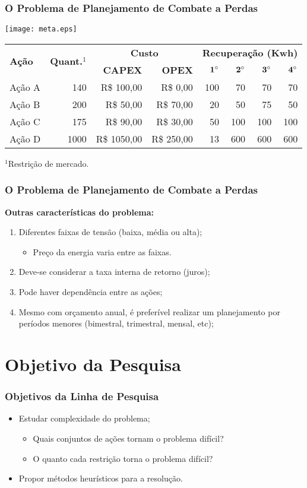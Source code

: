\documentclass[10pt,fleqn]{beamer}
\newcommand{\litem}[1]{
  \item{#1 \vspace{9pt}}
}
\newcommand{\chamada}[1]{
  \textcolor{ninfagreen}{\textbf{#1}}
  \vspace{10pt}
}
\begin{document}
\begin{frame}
  \frametitle{O Problema de Planejamento de Combate a Perdas}
    \begin{center}
	\texttt{[image: meta.eps]}
	\vspace{10pt}
    { \scriptsize
    \begin{tabular}{|l|r|r|r|r|r|r|r|}
      \hline
      \multirow{2}{*}{\bf Ação} & \multirow{2}{*}{\bf Quant.$^{1}$} & \multicolumn{2}{|c|}{\bf Custo} & \multicolumn{4}{c|}{\bf Recuperação (Kwh)} \\ \cline {3-4} \cline{5-8}
		& & {\bf CAPEX} & {\bf OPEX} & ${ \bf 1^\circ}$ & ${ \bf 2^\circ}$ & ${ \bf 3^\circ}$ & ${ \bf 4^\circ}$ \\ \hline
		Ação A & 140 & R\$ 100,00 & R\$ 0,00 & 100 & 70 & 70 & 70 \\ \hline
		Ação B & 200 & R\$ 50,00 & R\$ 70,00 & 20 & 50 & 75 & 50 \\ \hline
		Ação C & 175 & R\$ 90,00 & R\$ 30,00 & 50 & 100 & 100 & 100 \\ \hline
		Ação D & 1000 & R\$ 1050,00 &R\$ 250,00 & 13 & 600 & 600 & 600 \\ \hline
    \end{tabular}
	}
    \end{center}
	{\footnotesize $^1$Restrição de mercado.}
\end{frame}

\begin{frame}
  \frametitle{O Problema de Planejamento de Combate a Perdas}
  \chamada{Outras características do problema:}
  \begin{enumerate}
    \item{Diferentes faixas de tensão (baixa, média ou alta);}
    \begin{itemize}
      \litem{Preço da energia varia entre as faixas.}
    \end{itemize}
    \litem{Deve-se considerar a taxa interna de retorno (juros);}
    \litem{Pode haver dependência entre as ações;}
    \litem{Mesmo com orçamento anual, é preferível realizar um planejamento por
	  períodos menores (bimestral, trimestral, mensal, etc);}
  \end{enumerate}
\end{frame}

\section{Objetivo da Pesquisa}

\begin{frame}
  \frametitle{Objetivos da Linha de Pesquisa}
  \begin{itemize}
    \item{Estudar complexidade do problema;}
	\begin{itemize}
	  \item{Quais conjuntos de ações tornam o problema difícil?}
	  \litem{O quanto cada restrição torna o problema difícil?}
	\end{itemize}
    \litem{Propor métodos heurísticos para a resolução.}
  \end{itemize}
\end{frame}
\end{document}

